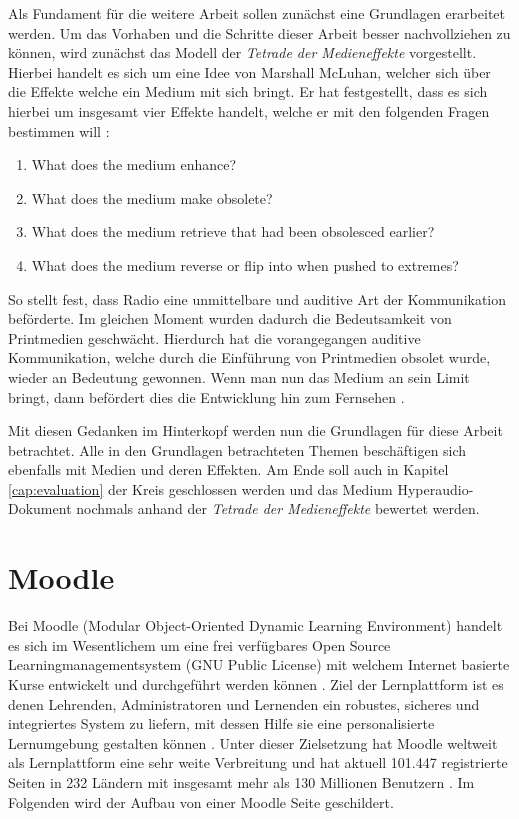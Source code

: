 \label{cha:grundlagen}
Als Fundament für die weitere Arbeit sollen zunächst eine Grundlagen erarbeitet werden. Um das Vorhaben und die Schritte dieser Arbeit besser nachvollziehen zu können, wird zunächst das Modell der \textit{Tetrade der Medieneffekte} vorgestellt. Hierbei handelt es sich um eine Idee von Marshall McLuhan, welcher sich über die Effekte welche ein Medium mit sich bringt. Er hat festgestellt, dass es sich hierbei um insgesamt vier Effekte handelt, welche er mit den folgenden Fragen bestimmen will \citep{mcluhan1977laws}:

\begin{enumerate}
\item What does the medium enhance?
\item What does the medium make obsolete?
\item What does the medium retrieve that had been obsolesced earlier?
\item What does the medium reverse or flip into when pushed to extremes?
\end{enumerate}

So stellt \cite{mcluhan1977laws} fest, dass Radio eine unmittelbare und auditive Art der Kommunikation beförderte. Im gleichen Moment wurden dadurch die Bedeutsamkeit von Printmedien geschwächt. Hierdurch hat die vorangegangen auditive Kommunikation, welche durch die Einführung von Printmedien obsolet wurde, wieder an Bedeutung gewonnen. Wenn man nun das Medium an sein Limit bringt, dann befördert dies die Entwicklung hin zum Fernsehen \citep{mcluhan1977laws}.

Mit diesen Gedanken im Hinterkopf werden nun die Grundlagen für diese Arbeit betrachtet. Alle in den Grundlagen betrachteten Themen beschäftigen sich ebenfalls mit Medien und deren Effekten. Am Ende soll auch in Kapitel \ref{cap:evaluation} der Kreis geschlossen werden und das Medium Hyperaudio-Dokument nochmals anhand der \textit{Tetrade der Medieneffekte} bewertet werden.


\section{Moodle}
\label{sec:moodle}
Bei Moodle (Modular Object-Oriented Dynamic Learning Environment) handelt es sich im Wesentlichem um eine frei verfügbares Open Source Learningmanagementsystem (GNU Public License) mit welchem Internet basierte Kurse entwickelt und durchgeführt werden können \citep{moodle2015was}. Ziel der Lernplattform ist es denen Lehrenden, Administratoren und Lernenden ein robustes, sicheres und integriertes System zu liefern, mit dessen Hilfe sie eine personalisierte Lernumgebung gestalten können \citep{moodle2018about}. Unter dieser Zielsetzung hat  Moodle weltweit als Lernplattform eine sehr weite Verbreitung und hat aktuell 101.447 registrierte Seiten in 232 Ländern mit insgesamt mehr als 130 Millionen Benutzern \citep{moodle2018stats}. Im Folgenden wird der Aufbau von einer Moodle Seite geschildert.

